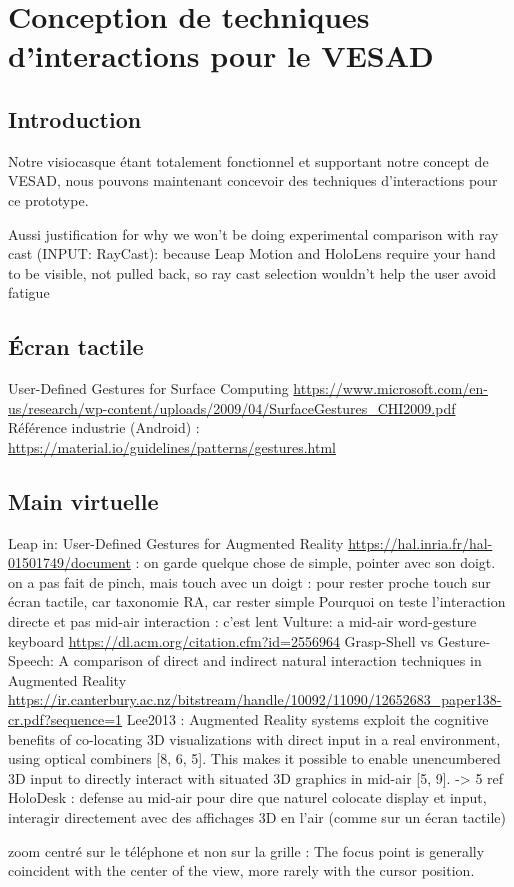 \section{Conception de techniques d'interactions pour le VESAD}
\label{sec:interaction_techniques}

\subsection{Introduction}
\label{subsec:interaction_techniques_intro}
Notre visiocasque étant totalement fonctionnel et supportant notre concept de VESAD, nous pouvons maintenant concevoir des techniques d'interactions pour ce prototype.

Aussi justification for why we won’t be doing experimental comparison with ray cast (INPUT: RayCast): because Leap Motion and HoloLens require your hand to be visible, not pulled back, so ray cast selection wouldn’t help the user avoid fatigue

\subsection{Écran tactile}
\label{subsec:interaction_techniques_screen}
User-Defined Gestures for Surface Computing \url{https://www.microsoft.com/en-us/research/wp-content/uploads/2009/04/SurfaceGestures_CHI2009.pdf}
Référence industrie (Android) : \url{https://material.io/guidelines/patterns/gestures.html}

\subsection{Main virtuelle}
\label{subsec:interaction_techniques_leap}
Leap in:
User-Defined Gestures for Augmented Reality \url{https://hal.inria.fr/hal-01501749/document} : on garde quelque chose de simple, pointer avec son doigt. on a pas fait de pinch, mais touch avec un doigt : pour rester proche touch sur écran tactile, car taxonomie RA, car rester simple
Pourquoi on teste l'interaction directe et pas mid-air interaction : c'est lent Vulture: a mid-air word-gesture keyboard \url{https://dl.acm.org/citation.cfm?id=2556964}
Grasp-Shell vs Gesture-Speech: A comparison of direct and indirect natural interaction
techniques in Augmented Reality \url{https://ir.canterbury.ac.nz/bitstream/handle/10092/11090/12652683_paper138-cr.pdf?sequence=1}
Lee2013 : Augmented Reality systems exploit the cognitive benefits of co-locating 3D visualizations with direct input in a real environment, using optical combiners [8, 6, 5]. This makes it possible to enable unencumbered 3D input to directly interact with situated 3D graphics in mid-air [5, 9]. -> 5 ref HoloDesk : defense au mid-air pour dire que naturel colocate display et input, interagir directement avec des affichages 3D en l'air (comme sur un écran tactile)

zoom centré sur le téléphone et non sur la grille : The focus point is generally coincident with the center of the view, more rarely with the cursor position. \cite{Guiard2004}